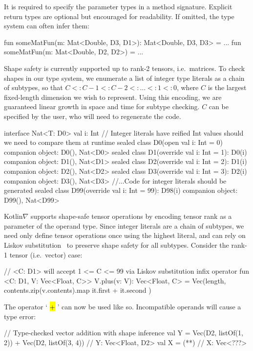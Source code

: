 \documentclass[12pt,initial,twoside,maitrise]{dms}
\makeatletter
\def\uwave{\bgroup \markoverwith{\lower3.5\p@\hbox{\sixly \textcolor{red}{\char58}}}\ULon}
\newcommand{\inline}[1]{%
    \begingroup%
    \sethlcolor{slightgray}%
    \hl{\ttfamily\small #1}%
    \endgroup
}
\numberwithin{equation}{section}
\numberwithin{table}{chapter}
\numberwithin{figure}{chapter}
\makeatother
\begin{document}
%
It is required to specify the parameter types in a method signature. Explicit return types are optional but encouraged for readability. If omitted, the type system can often infer them:
%
\begin{kotlinlisting}
fun someMatFun(m: Mat<Double, D3, D1>): Mat<Double, D3, D3> = ...
fun someMatFun(m: Mat<Double, D2, D2>) = ...
\end{kotlinlisting}
%
Shape safety is currently supported up to rank-2 tensors, i.e.\ matrices. To check shapes in our type system, we enumerate a list of integer type literals as a chain of subtypes, so that $C <: C - 1 <: C - 2 <: \dots <: 1 <: 0$, where $C$ is the largest fixed-length dimension we wish to represent. Using this encoding, we are guaranteed linear growth in space and time for subtype checking. $C$ can be specified by the user, who will need to regenerate the code.
%
\begin{kotlinlisting}[caption={Shape safe tensor addition for rank-1 tensors, $\forall C\leq2.$}]
interface Nat<T: D0> { val i: Int }
// Integer literals have reified Int values should we need to compare them at runtime
sealed class D0(open val i: Int = 0) { companion object: D0(), Nat<D0> }
sealed class D1(override val i: Int = 1): D0(i) { companion object: D1(), Nat<D1> }
sealed class D2(override val i: Int = 2): D1(i) { companion object: D2(), Nat<D2> }
sealed class D3(override val i: Int = 3): D2(i) { companion object: D3(), Nat<D3> }
//...Code for integer literals should be generated
sealed class D99(override val i: Int = 99): D98(i) { companion object: D99(), Nat<D99> }
\end{kotlinlisting}
%
Kotlin$\nabla$ supports shape-safe tensor operations by encoding tensor rank as a parameter of the operand type. Since integer literals are a chain of subtypes, we need only define tensor operations once using the highest literal, and can rely on Liskov substitution~\citep{liskov1987} to preserve shape safety for all subtypes. Consider the rank-1 tensor (i.e.\ vector) case:
%
\begin{kotlinlisting}
// <C: D1> will accept 1 <= C <= 99 via Liskov substitution
infix operator fun <C: D1, V: Vec<Float, C>> V.plus(v: V): Vec<Float, C> =
    Vec(length, contents.zip(v.contents).map { it.first + it.second })
\end{kotlinlisting}
%
The operator `\inline{+}' can now be used like so. Incompatible operands will cause a type error:
%
\begin{kotlinlisting}
// Type-checked vector addition with shape inference
val Y = Vec(D2, listOf(1, 2)) + Vec(D2, listOf(3, 4)) // Y: Vec<Float, D2>
val X = (*\uwave{Vec(D2, listOf(1, 2)) + Vec(D5, listOf(3, 4, 1, 2, 4))}*) // X: Vec<???>
\end{kotlinlisting}
\end{document}
